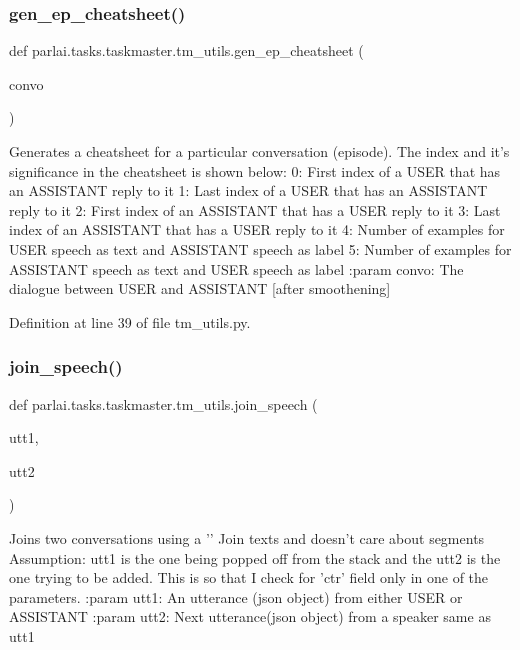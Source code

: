 \subsubsection{\texorpdfstring{gen\+\_\+ep\+\_\+cheatsheet()}{gen\_ep\_cheatsheet()}}
{\footnotesize\ttfamily def parlai.\+tasks.\+taskmaster.\+tm\+\_\+utils.\+gen\+\_\+ep\+\_\+cheatsheet (\begin{DoxyParamCaption}\item[{}]{convo }\end{DoxyParamCaption})}

\begin{DoxyVerb}Generates a cheatsheet for a particular conversation (episode).
The index and it's significance in the cheatsheet is shown below:
    0: First index of a USER that has an ASSISTANT reply to it
    1: Last index of a USER that has an ASSISTANT reply to it
    2: First index of an ASSISTANT that has a USER reply to it
    3: Last index of an ASSISTANT that has a USER reply to it
    4: Number of examples for USER speech  as text and ASSISTANT speech as label
    5: Number of examples for ASSISTANT speech as text and USER speech  as label
:param convo:
    The dialogue between USER and ASSISTANT [after smoothening]
\end{DoxyVerb}
 

Definition at line 39 of file tm\+\_\+utils.\+py.

\mbox{\label{namespaceparlai_1_1tasks_1_1taskmaster_1_1tm__utils_ad5d13cd462bd26919f078aa93174e9cd}} 
\subsubsection{\texorpdfstring{join\+\_\+speech()}{join\_speech()}}
{\footnotesize\ttfamily def parlai.\+tasks.\+taskmaster.\+tm\+\_\+utils.\+join\+\_\+speech (\begin{DoxyParamCaption}\item[{}]{utt1,  }\item[{}]{utt2 }\end{DoxyParamCaption})}

\begin{DoxyVerb}Joins two conversations using a '\n'
Join texts and doesn't care about segments
Assumption: utt1 is the one being popped off from the stack and the utt2
            is the one trying to be added. This is so that I check for 'ctr'
            field only in one of the parameters.
:param utt1:
    An utterance (json object) from either USER or ASSISTANT
:param utt2:
    Next utterance(json object) from a speaker same as utt1
\end{DoxyVerb}
 

